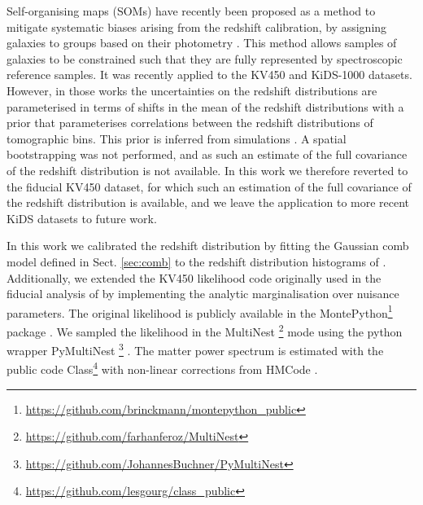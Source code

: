 \documentclass{aa}
\begin{document}
Self-organising maps (SOMs) have recently been proposed as a method to mitigate systematic biases arising from the redshift calibration, by assigning galaxies to groups based on their photometry \citep{buchs, wright_som, masters15}. This method allows samples of galaxies to be constrained such that they are fully represented by spectroscopic reference samples. It was recently applied to the KV450 \citep{wright_som_kv450} and KiDS-1000 \citep{hildebrandt20, asgari20} datasets. However, in those works the uncertainties on the redshift distributions are parameterised in terms of shifts in the mean of the redshift distributions with a prior that parameterises correlations between the redshift distributions of tomographic bins. This prior is inferred from simulations \citep{wright_som, hildebrandt20, vdBusch20}. A spatial bootstrapping was not performed, and as such an estimate of the full covariance of the redshift distribution is not available. In this work we therefore reverted to the fiducial KV450 dataset, for which such an estimation of the full covariance of the redshift distribution is available, and we leave the application to more recent KiDS datasets to future work.

In this work we calibrated the redshift distribution by fitting the Gaussian comb model defined in Sect. \ref{sec:comb} to the redshift distribution histograms of \cite{hildebrandt18}. Additionally, we extended the KV450 likelihood code originally used in the fiducial analysis of \cite{hildebrandt18} by implementing the analytic marginalisation over nuisance parameters. The original likelihood is publicly available in the {\sc MontePython}\footnote{\url{https://github.com/brinckmann/montepython_public}} package \citep{Audren:2012wb, Brinckmann:2018cvx}. We sampled the likelihood in the {\sc MultiNest} \footnote{\url{https://github.com/farhanferoz/MultiNest}} mode \citep{feroz09,feroz19} using the python wrapper {\sc PyMultiNest} \footnote{\url{https://github.com/JohannesBuchner/PyMultiNest}} \citep{buchner14}. The matter power spectrum is estimated with the public code {\sc Class}\footnote{\url{https://github.com/lesgourg/class_public}}\citep{blas11} with non-linear corrections from {\sc HMCode} \citep{mead15}. 
\end{document}
